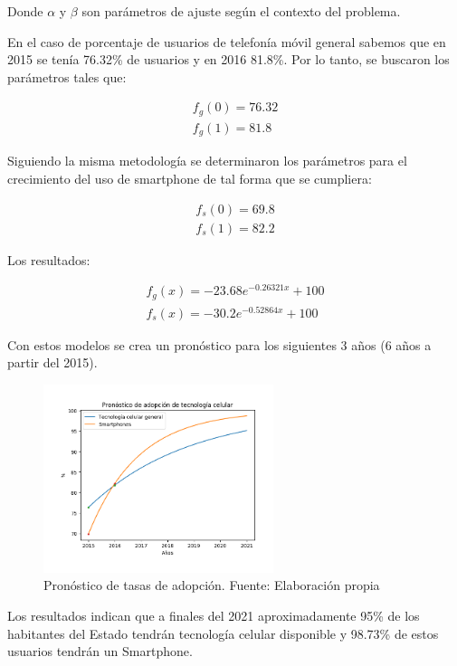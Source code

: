 \documentclass{article}
\begin{document}
Donde $\alpha$ y $\beta$ son parámetros de ajuste según el contexto del problema.

En el caso de porcentaje de usuarios de telefonía móvil general sabemos que en 2015 se tenía 76.32\% de usuarios y
en 2016 81.8\%. Por lo tanto, se buscaron los parámetros tales que:

\begin{align*}
f_g(0) = 76.32 \\
f_g(1) = 81.8
\end{align*}

Siguiendo la misma metodología se determinaron los parámetros para el crecimiento del uso de smartphone de tal forma
que se cumpliera:

\begin{align*}
f_s(0) = 69.8 \\
f_s(1) = 82.2
\end{align*}

Los resultados:

\begin{align*}
f_g(x) = -23.68e^{-0.26321x}+100 \\
f_s(x) = -30.2e^{-0.52864x}+100
\end{align*}

Con estos modelos se crea un pronóstico para los siguientes 3 años (6 años a partir del 2015).

	\begin{figure}[H]\centering
	\includegraphics[width=0.6\textwidth]{resources/img/pronostico_adopcion.png}
	\caption{\label{fig:pron_adp} Pronóstico de tasas de adopción. Fuente: Elaboración propia}
    \end{figure}

Los resultados indican que a finales del 2021 aproximadamente 95\% de los habitantes del Estado
tendrán tecnología celular disponible y 98.73\% de estos usuarios tendrán un Smartphone.
\end{document}

